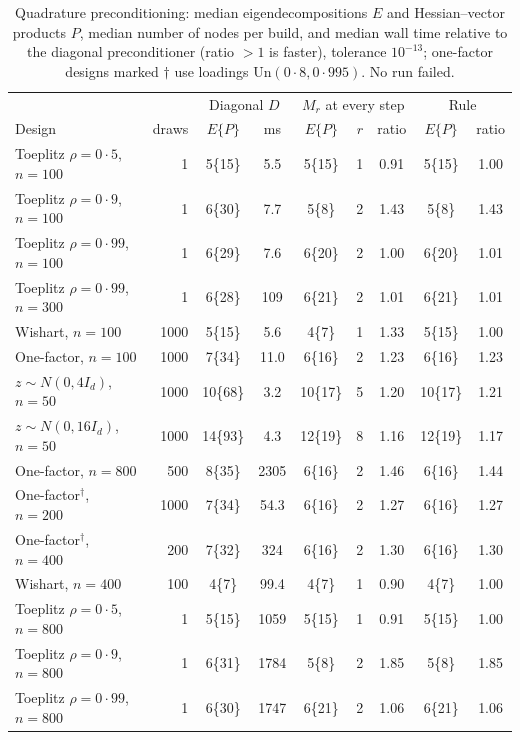 \documentclass[11pt]{article}
\begin{document}
\begin{table}[h]
\centering
\caption{Quadrature preconditioning: median eigendecompositions $E$ and
Hessian--vector products $P$, median number of nodes per build, and
median wall time relative to the diagonal preconditioner (ratio $>1$
is faster), tolerance $10^{-13}$; one-factor designs marked
$\dagger$ use loadings $\mathrm{Un}(0{\cdot}8,0{\cdot}995)$. No run
failed.}\label{tab:quad}
\medskip
\small
\begin{tabular}{lrcc|ccc|cc}
\toprule
 & & \multicolumn{2}{c|}{Diagonal $D$} & \multicolumn{3}{c|}{$M_r$ at every step} & \multicolumn{2}{c}{Rule}\\
Design & draws & $E\{P\}$ & ms & $E\{P\}$ & $r$ & ratio & $E\{P\}$ & ratio\\
\midrule
Toeplitz $\rho=0{\cdot}5$, $n=100$ & 1 & 5\{15\} & 5.5 & 5\{15\} & 1 & 0.91 & 5\{15\} & 1.00\\
Toeplitz $\rho=0{\cdot}9$, $n=100$ & 1 & 6\{30\} & 7.7 & 5\{8\} & 2 & 1.43 & 5\{8\} & 1.43\\
Toeplitz $\rho=0{\cdot}99$, $n=100$ & 1 & 6\{29\} & 7.6 & 6\{20\} & 2 & 1.00 & 6\{20\} & 1.01\\
Toeplitz $\rho=0{\cdot}99$, $n=300$ & 1 & 6\{28\} & 109 & 6\{21\} & 2 & 1.01 & 6\{21\} & 1.01\\
Wishart, $n=100$ & 1000 & 5\{15\} & 5.6 & 4\{7\} & 1 & 1.33 & 5\{15\} & 1.00\\
One-factor, $n=100$ & 1000 & 7\{34\} & 11.0 & 6\{16\} & 2 & 1.23 & 6\{16\} & 1.23\\
$z\sim N(0,4I_d)$, $n=50$ & 1000 & 10\{68\} & 3.2 & 10\{17\} & 5 & 1.20 & 10\{17\} & 1.21\\
$z\sim N(0,16I_d)$, $n=50$ & 1000 & 14\{93\} & 4.3 & 12\{19\} & 8 & 1.16 & 12\{19\} & 1.17\\
One-factor, $n=800$ & 500 & 8\{35\} & 2305 & 6\{16\} & 2 & 1.46 & 6\{16\} & 1.44\\
\addlinespace[2pt]
One-factor$^{\dagger}$, $n=200$ & 1000 & 7\{34\} & 54.3 & 6\{16\} & 2 & 1.27 & 6\{16\} & 1.27\\
One-factor$^{\dagger}$, $n=400$ & 200 & 7\{32\} & 324 & 6\{16\} & 2 & 1.30 & 6\{16\} & 1.30\\
Wishart, $n=400$ & 100 & 4\{7\} & 99.4 & 4\{7\} & 1 & 0.90 & 4\{7\} & 1.00\\
Toeplitz $\rho=0{\cdot}5$, $n=800$ & 1 & 5\{15\} & 1059 & 5\{15\} & 1 & 0.91 & 5\{15\} & 1.00\\
Toeplitz $\rho=0{\cdot}9$, $n=800$ & 1 & 6\{31\} & 1784 & 5\{8\} & 2 & 1.85 & 5\{8\} & 1.85\\
Toeplitz $\rho=0{\cdot}99$, $n=800$ & 1 & 6\{30\} & 1747 & 6\{21\} & 2 & 1.06 & 6\{21\} & 1.06\\
\bottomrule
\end{tabular}
\end{table}
\end{document}
